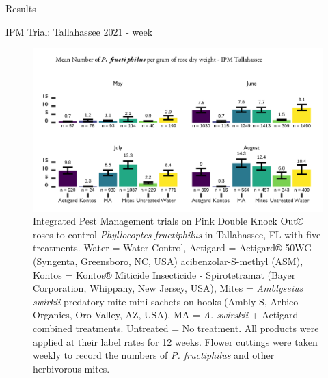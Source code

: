\documentclass[
  ignorenonframetext,
]{beamer}
\begin{document}
\begin{frame}{Results}
\begin{block}{IPM Trial: Tallahassee 2021 - week}
\protect\hypertarget{ipm-trial-tallahassee-2021---week}{}
\begin{figure}
\includegraphics[width=0.8\linewidth]{figure/rrv_ipm_graph_erios_talla_week} \caption{Integrated Pest Management trials on Pink Double Knock Out® roses to control \textit{Phyllocoptes fructiphilus} in Tallahassee, FL with five treatments. Water = Water Control, Actigard = Actigard® 50WG (Syngenta, Greensboro, NC, USA) acibenzolar-S-methyl (ASM), Kontos = Kontos® Miticide Insecticide - Spirotetramat (Bayer Corporation, Whippany, New Jersey, USA), Mites = \textit{Amblyseius swirkii} predatory mite mini sachets on hooks (Ambly-S, Arbico Organics, Oro Valley, AZ, USA), MA = \textit{A. swirskii} + Actigard combined treatments. Untreated = No treatment. All products were applied at their label rates for 12 weeks. Flower cuttings were taken weekly to record the numbers of \textit{P. fructiphilus} and other herbivorous mites.}\label{fig:ipm-talla-erios-week}
\end{figure}
\end{block}


\end{frame}
\end{document}
